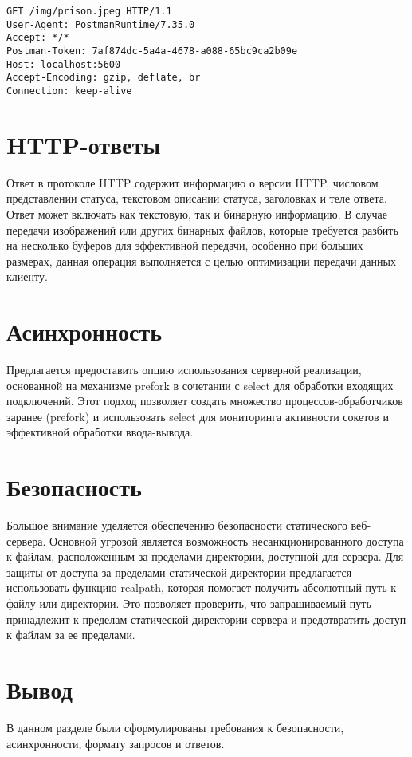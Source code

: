 \documentclass{bmstu}
\begin{document}
\begin{lstlisting}[caption={Пример HTTP-запроса через Postman}, label=lst:http]
GET /img/prison.jpeg HTTP/1.1
User-Agent: PostmanRuntime/7.35.0
Accept: */*
Postman-Token: 7af874dc-5a4a-4678-a088-65bc9ca2b09e
Host: localhost:5600
Accept-Encoding: gzip, deflate, br
Connection: keep-alive
\end{lstlisting}


\section{HTTP-ответы}

Ответ в протоколе HTTP содержит информацию о версии HTTP, числовом представлении статуса, текстовом описании статуса, заголовках и теле ответа. Ответ может включать как текстовую, так и бинарную информацию. В случае передачи изображений или других бинарных файлов, которые требуется разбить на несколько буферов для эффективной передачи, особенно при больших размерах, данная операция выполняется с целью оптимизации передачи данных клиенту.

\section{Асинхронность}
Предлагается предоставить опцию использования серверной реализации, основанной на механизме prefork 
в сочетании с select для обработки входящих подключений. Этот подход позволяет создать множество 
процессов-обработчиков заранее (prefork) и использовать select для мониторинга активности сокетов и 
эффективной обработки ввода-вывода.

\section{Безопасность}

Большое внимание уделяется обеспечению безопасности статического веб-сервера. Основной угрозой является 
возможность несанкционированного доступа к файлам, расположенным за пределами директории, доступной для сервера.
Для защиты от доступа за пределами статической директории предлагается использовать функцию realpath, которая помогает получить абсолютный путь к файлу или директории. Это позволяет проверить, что запрашиваемый путь принадлежит к пределам статической директории сервера и предотвратить доступ к файлам за ее пределами.

\section{Вывод}
В данном разделе были сформулированы требования к безопасности, асинхронности, формату запросов и ответов.
\end{document}
